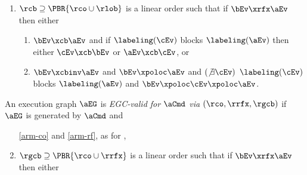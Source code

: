 \begin{definition}
\begin{enumerate}[resume,label=(\textsc{a}\arabic*),ref=\textsc{a}\arabic*]
\begin{enumerate}
    \end{enumerate}
  \item \label{arm-cb}
    ${\rcb}\supseteq\PBR{{\rco}\cup{\rlob}}$ is a linear order %
    such that if $\bEv\xrfx\aEv$ then either
    \begin{enumerate}%
    \item \label{arm-rfe}
      $\bEv\xcb\aEv$ and if $\labeling(\cEv)$ blocks $\labeling(\aEv)$ then either $\cEv\xcb\bEv$ or $\aEv\xcb\cEv$, or
    \item \label{arm-rfi}
      $\bEv\xcbinv\aEv$ and $\bEv\xpoloc\aEv$ and $(\not\exists\cEv)$ $\labeling(\cEv)$ blocks $\labeling(\aEv)$ and $\bEv\xpoloc\cEv\xpoloc\aEv$.
    \end{enumerate}
  \end{enumerate}
  An \armeight{} execution graph $\aEG$ is \emph{EGC-valid for $\aCmd$ via}
  $({\rco}, {\rrfx}, {\rgcb})$ if $\aEG$ is generated by $\aCmd$ and 
  \begin{enumerate}[resume,label=(\textsc{a}\arabic*),ref=\textsc{a}\arabic*]
  \item[\eqref{arm-co}] and \eqref{arm-rf}, as for \EC,
  \item \label{arm-gcb}
    ${\rgcb}\supseteq\PBR{{\rco}\cup{\rrfx}}$ is a linear order %
    such that if $\bEv\xrfx\aEv$ then either
    \begin{enumerate}%

\end{enumerate}
\end{enumerate}
\end{definition}
